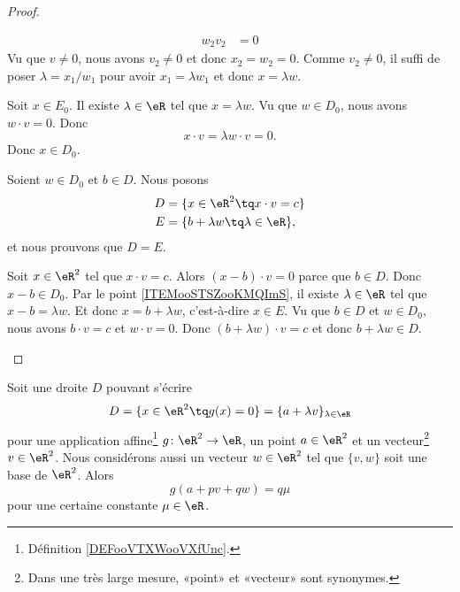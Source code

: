 \begin{proof}
\begin{subproof}
\begin{subproof}
\begin{subproof}
\begin{subequations}
\begin{align}
						w_2v_2 & =0
					\end{align}
				\end{subequations}
				Vu que \( v\neq 0\), nous avons \( v_2\neq 0\) et donc \( x_2=w_2=0\). Comme \( v_2\neq 0\), il suffi de poser \( \lambda=x_1/w_1\) pour avoir \( x_1=\lambda w_1\) et donc \( x=\lambda w\).
			\end{subproof}
			\spitem[\( E_0\subset D_0\)]
			Soit \( x\in E_0\). Il existe \( \lambda\in \eR\) tel que \( x=\lambda w\). Vu que \( w\in D_0\), nous avons \( w\cdot v=0\). Donc
			\begin{equation}
				x\cdot v=\lambda w\cdot v=0.
			\end{equation}
			Donc \( x\in D_0\).
		\end{subproof}
		Soient \( w\in D_0\) et \( b\in D\). Nous posons
		\begin{subequations}
			\begin{align}
				D & =\{ x\in \eR^2\tq x\cdot v=c \}       \\
				E & =\{ b+\lambda w\tq \lambda\in \eR \},
			\end{align}
		\end{subequations}
		et nous prouvons que \( D=E\).
		\begin{subproof}
			\spitem[\( D\subset E\)]
			Soit \( x\in \eR^2\) tel que \( x\cdot v=c\). Alors \( (x-b)\cdot v=0\) parce que \( b\in D\). Donc \( x-b\in D_0\). Par le point \ref{ITEMooSTSZooKMQImS}, il existe \( \lambda\in \eR\) tel que \( x-b=\lambda w\). Et donc \( x=b+\lambda w\), c'est-à-dire \( x\in E\).
			\spitem[\( E\subset D\)]
			Vu que \( b\in D\) et \( w\in D_0\), nous avons  \( b\cdot v=c\) et \( w\cdot v=0\). Donc \( (b+\lambda w)\cdot v=c\) et donc \( b+\lambda w\in D\).
		\end{subproof}
	\end{subproof}
\end{proof}



\begin{lemma}	\label{LEMooYIKXooASjLDt}
	Soit une droite \( D\) pouvant s'écrire
	\begin{equation}
		D=\{ x\in \eR^2\tq g(x)=0 \}=\{ a+\lambda v \}_{\lambda\in \eR}
	\end{equation}
	pour une application affine\footnote{Définition \ref{DEFooVTXWooVXfUnc}.} \(g \colon \eR^2\to \eR  \), un point \( a\in \eR^2\) et un vecteur\footnote{Dans une très large mesure, «point» et «vecteur» sont synonymes.} \( v\in \eR^2\). Nous considérons aussi un vecteur \( w\in \eR^2\) tel que \( \{v,w \}\) soit une base de \( \eR^2\). Alors
	\begin{equation}
		g(a+pv+qw)=q\mu
	\end{equation}
	pour une certaine constante \( \mu\in \eR\).
\end{lemma}

